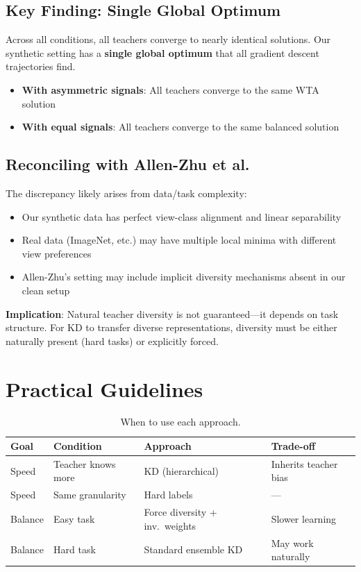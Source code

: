 \documentclass{article}
\begin{document}
\subsection{Key Finding: Single Global Optimum}

Across all conditions, all teachers converge to nearly identical solutions. Our synthetic setting has a \textbf{single global optimum} that all gradient descent trajectories find.

\begin{itemize}
    \item \textbf{With asymmetric signals}: All teachers converge to the same WTA solution
    \item \textbf{With equal signals}: All teachers converge to the same balanced solution
\end{itemize}

\subsection{Reconciling with Allen-Zhu et al.}

The discrepancy likely arises from data/task complexity:
\begin{itemize}
    \item Our synthetic data has perfect view-class alignment and linear separability
    \item Real data (ImageNet, etc.) may have multiple local minima with different view preferences
    \item Allen-Zhu's setting may include implicit diversity mechanisms absent in our clean setup
\end{itemize}

\textbf{Implication}: Natural teacher diversity is not guaranteed---it depends on task structure. For KD to transfer diverse representations, diversity must be either naturally present (hard tasks) or explicitly forced.

\section{Practical Guidelines}
\label{sec:practical}

\begin{table}[h]
\centering
\caption{When to use each approach.}
\label{tab:guidelines}
\begin{tabular}{@{}llll@{}}
\toprule
Goal & Condition & Approach & Trade-off \\
\midrule
Speed & Teacher knows more & KD (hierarchical) & Inherits teacher bias \\
Speed & Same granularity & Hard labels & --- \\
Balance & Easy task & Force diversity + inv.\ weights & Slower learning \\
Balance & Hard task & Standard ensemble KD & May work naturally \\
\bottomrule
\end{tabular}
\end{table}
\end{document}
